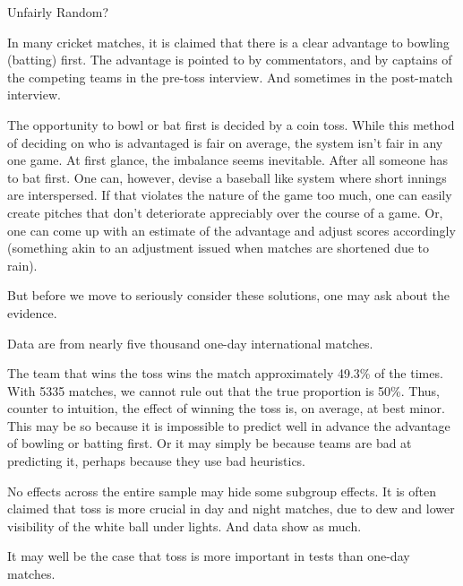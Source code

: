Unfairly Random? 

In many cricket matches, it is claimed that there is a clear advantage to bowling (batting) first. The advantage is pointed to by commentators, and by captains of the competing teams in the pre-toss interview. And sometimes in the post-match interview.

The opportunity to bowl or bat first is decided by a coin toss. While this method of deciding on who is advantaged is fair on average, the system isn’t fair in any one game. At first glance, the imbalance seems inevitable. After all someone has to bat first. One can, however, devise a baseball like system where short innings are interspersed. If that violates the nature of the game too much, one can easily create pitches that don’t deteriorate appreciably over the course of a game. Or, one can come up with an estimate of the advantage and adjust scores accordingly (something akin to an adjustment issued when matches are shortened due to rain).

But before we move to seriously consider these solutions, one may ask about the evidence.

Data are from nearly five thousand one-day international matches.

The team that wins the toss wins the match approximately 49.3\% of the times. With 5335 matches, we cannot rule out that the true proportion is 50\%. Thus, counter to intuition, the effect of winning the toss is, on average, at best minor. This may be so because it is impossible to predict well in advance the advantage of bowling or batting first. Or it may simply be because teams are bad at predicting it, perhaps because they use bad heuristics.

No effects across the entire sample may hide some subgroup effects. It is often claimed that toss is more crucial in day and night matches, due to dew and lower visibility of the white ball under lights. And data show as much.

It may well be the case that toss is more important in tests than one-day matches.

